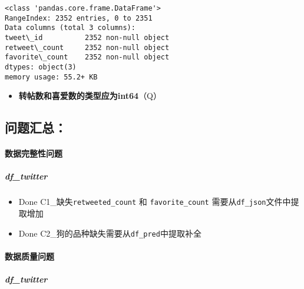 \documentclass[11pt]{article}
\providecommand{\tightlist}{%
      \setlength{\itemsep}{0pt}\setlength{\parskip}{0pt}}
\begin{document}
    \begin{Verbatim}[commandchars=\\\{\}]
<class 'pandas.core.frame.DataFrame'>
RangeIndex: 2352 entries, 0 to 2351
Data columns (total 3 columns):
tweet\_id          2352 non-null object
retweet\_count     2352 non-null object
favorite\_count    2352 non-null object
dtypes: object(3)
memory usage: 55.2+ KB

    \end{Verbatim}

    \begin{itemize}
\tightlist
\item
  \textbf{转帖数和喜爱数的类型应为int64}（Q）
\end{itemize}

    \hypertarget{ux95eeux9898ux6c47ux603b}{%
\subsection{问题汇总：}\label{ux95eeux9898ux6c47ux603b}}

\hypertarget{ux6570ux636eux5b8cux6574ux6027ux95eeux9898}{%
\paragraph{数据完整性问题}\label{ux6570ux636eux5b8cux6574ux6027ux95eeux9898}}

\hypertarget{df_twitter}{%
\subparagraph{df\_twitter}\label{df_twitter}}

\begin{itemize}
\tightlist
\item
  Done C1\_缺失\texttt{retweeted\_count} 和 \texttt{favorite\_count}
  需要从\texttt{df\_json}文件中提取增加
\item
  Done C2\_狗的品种缺失需要从\texttt{df\_pred}中提取补全
\end{itemize}

\hypertarget{ux6570ux636eux8d28ux91cfux95eeux9898}{%
\paragraph{数据质量问题}\label{ux6570ux636eux8d28ux91cfux95eeux9898}}

\hypertarget{df_twitter-1}{%
\subparagraph{df\_twitter}\label{df_twitter-1}}
\end{document}
